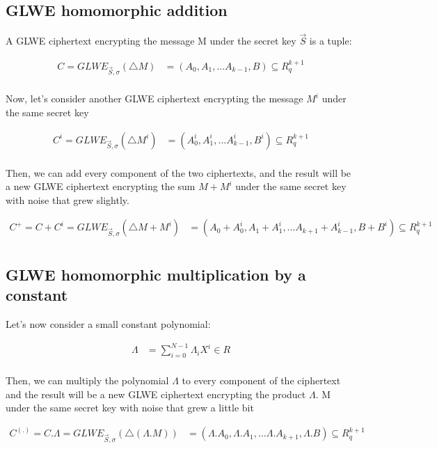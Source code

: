\documentclass{techrep}
\theoremstyle{definition}
\theoremstyle{plain}
\begin{document}
\subsection{GLWE homomorphic addition}

A GLWE ciphertext encrypting the message M under the secret key $\overrightarrow{S}$ is a tuple:

	\begin{align*}
C = GLWE_{\overrightarrow{S},\sigma}(\bigtriangleup M)	&=	 (A_0,A_1,...A_{k-1}, B) \subseteq  R_{q}^{k+1} \\
	\end{align*}

Now, let’s consider another GLWE ciphertext encrypting the message $M^i$ under the same secret key

	\begin{align*}
C^i = GLWE_{\overrightarrow{S},\sigma}(\bigtriangleup M^i)	&=	 (A_0^i,A_1^i,...A_{k-1}^i, B^i) \subseteq  R_{q}^{k+1} \\
	\end{align*}

Then, we can add every component of the two ciphertexts, and the result will be a new GLWE ciphertext encrypting the sum $M + M^i$ under the same secret key with noise that grew slightly.

	\begin{align*}
C^+ = C+ C^i = GLWE_{\overrightarrow{S},\sigma}(\bigtriangleup M+M^i)	&=	 (A_0+A_0^i,A_1+A_1^i,...A_{k+1}+A_{k-1}^i, B+B^i) \subseteq  R_{q}^{k+1} \\
	\end{align*}

\subsection{GLWE homomorphic multiplication by a constant}
Let's now consider a small constant polynomial:

	\begin{align*}
		 \Lambda &=   \sum_{i=0}^{N-1}\Lambda_iX^i \in R  \\
	\end{align*}

Then, we can multiply the polynomial $\Lambda$ to every component of the ciphertext and the result will be a new GLWE ciphertext encrypting the product $\Lambda$. M under the same secret key with noise that grew a little bit 


	\begin{align*}
C^{(.)} = C.\Lambda = GLWE_{\overrightarrow{S},\sigma}(\bigtriangleup (\Lambda . M))	&=	 (\Lambda.A_0,\Lambda.A_1,...\Lambda.A_{k+1}, \Lambda.B) \subseteq  R_{q}^{k+1} \\
	\end{align*}
\end{document}
